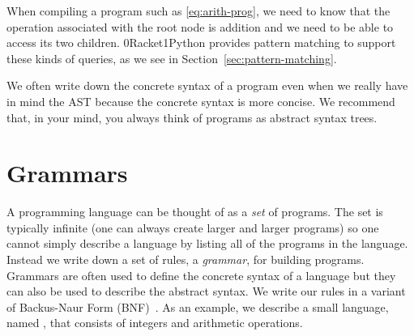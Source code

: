 \documentclass[7x10,nocrop]{TimesAPriori_MIT}%
\def\racketEd{0}
\def\pythonEd{1}
\def\edition{0}
\newcommand{\racket}[1]{{\if\edition\racketEd{#1}\fi}}
\newcommand{\python}[1]{{\if\edition\pythonEd #1\fi}}
\begin{document}
When compiling a program such as \eqref{eq:arith-prog}, we need to
know that the operation associated with the root node is addition and
we need to be able to access its two children. \racket{Racket}\python{Python}
provides pattern matching to support these kinds of queries, as we see in
Section~\ref{sec:pattern-matching}.

We often write down the concrete syntax of a program even when we
really have in mind the AST because the concrete syntax is more
concise.  We recommend that, in your mind, you always think of
programs as abstract syntax trees.

\section{Grammars}
\label{sec:grammar}

A programming language can be thought of as a \emph{set} of programs.
The set is typically infinite (one can always create larger and larger
programs) so one cannot simply describe a language by listing all of
the programs in the language. Instead we write down a set of rules, a
\emph{grammar}, for building programs. Grammars are often used to
define the concrete syntax of a language but they can also be used to
describe the abstract syntax. We write our rules in a variant of
Backus-Naur Form (BNF)~\citep{Backus:1960aa,Knuth:1964aa}.
As an example, we describe a small language, named \LangInt{}, that consists of
integers and arithmetic operations.
\end{document}
